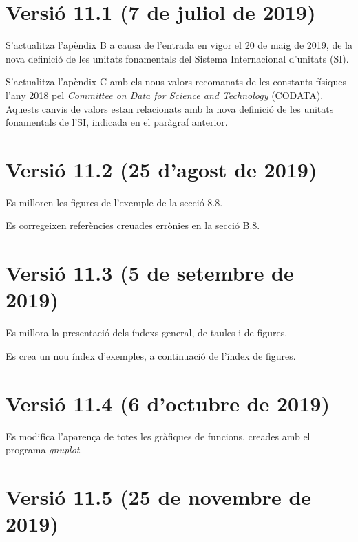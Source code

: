 \section*{Versió 11.1 (7 de juliol de 2019)}

S'actualitza l'apèndix B a causa de l'entrada en vigor el 20 de maig de 2019, de la nova definició de les unitats fonamentals del Sistema Internacional d'unitats (SI).

S'actualitza l'apèndix  C amb els nous valors recomanats de les constants físiques  l'any 2018 pel \textit{Committee on Data for Science and Technology} (CODATA). Aquests canvis de  valors estan  relacionats amb la nova definició de les unitats fonamentals de l'SI, indicada en el paràgraf anterior.

\section*{Versió 11.2 (25 d'agost de 2019)}

Es milloren les figures de l'exemple de la secció 8.8.

Es corregeixen referències creuades errònies en la secció B.8.

\section*{Versió 11.3 (5 de setembre de 2019)}

Es millora la presentació dels índexs general, de taules i de figures.

Es crea un nou índex d'exemples, a continuació de l'índex de figures.

\section*{Versió 11.4 (6 d'octubre de 2019)}

Es modifica l'aparença de totes les gràfiques de funcions, creades amb el programa \emph{gnuplot}.

\section*{Versió 11.5 (25 de novembre de 2019)}

